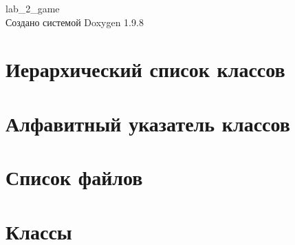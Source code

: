 \documentclass[twoside]{book}
\newcommand{\+}{\discretionary{\mbox{\scriptsize$\hookleftarrow$}}{}{}}
\newcommand{\clearemptydoublepage}{%
    \newpage{\pagestyle{empty}\cleardoublepage}%
  }
\begin{document}
  \raggedbottom
    \hypersetup{pageanchor=false,
                bookmarksnumbered=true,
                pdfencoding=unicode
               }
  \begin{titlepage}
  \vspace*{7cm}
  \begin{center}%
  {\Large lab\+\_\+2\+\_\+game}\\
  \vspace*{1cm}
  {\large Создано системой Doxygen 1.9.8}\\
  \end{center}
  \end{titlepage}
  \clearemptydoublepage
  \tableofcontents
  \clearemptydoublepage
  \hypersetup{pageanchor=true}
\chapter{Иерархический список классов}

\chapter{Алфавитный указатель классов}

\chapter{Список файлов}

\chapter{Классы}

























\end{document}
